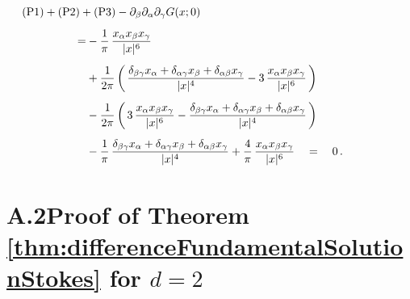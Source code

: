 \begin{align*}
  &\hspace{-2cm}\mathrm{(P1)} + \mathrm{(P2)} + \mathrm{(P3)} - \partial_\beta \partial_\alpha \partial_\gamma G(x; 0) \\[0.5em]
  = &- \frac{1}{\pi}\, \frac{x_\alpha x_\beta x_\gamma}{|x|^6} \\[0.5em]
    &+ \frac{1}{2\pi} \, \bigg(\,\frac{\delta_{\beta\gamma} x_\alpha + \delta_{\alpha \gamma} x_\beta + \delta_{\alpha \beta} x_\gamma}{|x|^4} - 3\, \frac{x_\alpha x_\beta x_\gamma}{|x|^6} \, \bigg) \\[0.5em]
    &- \frac{1}{2\pi} \, \bigg( \, 3\, \frac{x_\alpha x_\beta x_\gamma}{|x|^6} - \frac{\delta_{\beta\gamma} x_\alpha + \delta_{\alpha\gamma} x_\beta + \delta_{\alpha\beta} x_\gamma}{|x|^4} \, \bigg)\\[0.5em]
   &- \frac{1}{\pi}\, \frac{\delta_{\beta \gamma} x_\alpha + \delta_{\alpha \gamma} x_\beta + \delta_{\alpha\beta} x_\gamma}{|x|^4} 
     + \frac{4}{\pi}\, \frac{x_\alpha x_\beta x_\gamma}{|x|^6} 
     \quad=\quad 0 \,.
\end{align*}


\section*{A.2\quad Proof of Theorem \ref{thm:differenceFundamentalSolutionStokes} for $d = 2$}
\label{sec:A2}


